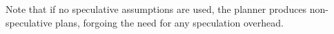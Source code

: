 %
%
Note that if no speculative assumptions are used, the planner produces
non-speculative plans, forgoing the need for any speculation overhead.
